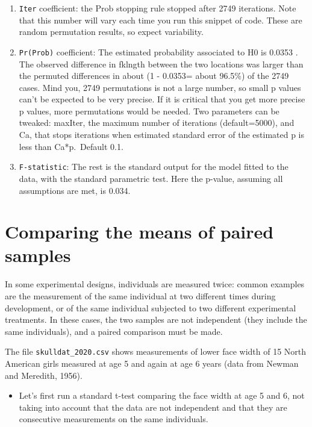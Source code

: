 \documentclass[
  12pt,
]{book}
\providecommand{\tightlist}{%
  \setlength{\itemsep}{0pt}\setlength{\parskip}{0pt}}
\begin{document}
\begin{enumerate}
\def\labelenumi{\arabic{enumi}.}
\tightlist
\item
  \texttt{Iter} coefficient: the Prob stopping rule stopped after 2749 iterations. Note that this number will vary each time you run this snippet of code. These are random permutation results, so expect variability.
\item
  \texttt{Pr(Prob)} coefficient: The estimated probability associated to H0 is 0.0353 . The observed difference in fklngth between the two locations was larger than the permuted differences in about (1 - 0.0353= about 96.5\%) of the 2749 cases. Mind you, 2749 permutations is not a large number, so small p values can't be expected to be very precise. If it is critical that you get more precise p values, more permutations would be needed. Two parameters can be tweaked: maxIter, the maximum number of iterations (default=5000), and Ca, that stops iterations when estimated standard error of the estimated p is less than Ca*p.~Default 0.1.
\item
  \texttt{F-statistic}: The rest is the standard output for the model fitted to the data, with the standard parametric test. Here the p-value, assuming all assumptions are met, is 0.034.
\end{enumerate}

\hypertarget{comparing-the-means-of-paired-samples}{%
\section{Comparing the means of paired samples}\label{comparing-the-means-of-paired-samples}}

In some experimental designs, individuals are measured twice: common examples are the measurement of the same individual at two different times during development, or of the same individual subjected to two different experimental treatments. In these cases, the two samples are not independent (they include the same individuals), and a paired comparison must be made.

The file \texttt{skulldat\_2020.csv} shows measurements of lower face width of 15 North American girls measured at age 5 and again at age 6 years (data from Newman and Meredith, 1956).

\begin{itemize}
\tightlist
\item
  Let's first run a standard t-test comparing the face width at age 5 and 6, not taking into account that the data are not independent and that they are consecutive measurements on the same individuals.
\end{itemize}
\end{document}
